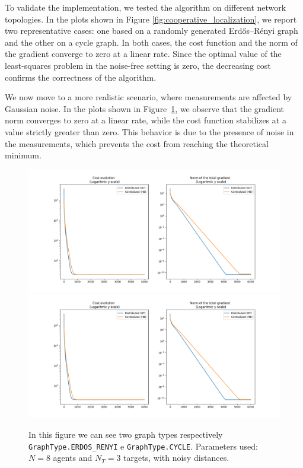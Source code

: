 To validate the implementation, we tested the algorithm on different network topologies. In the plots shown in Figure \ref{fig:cooperative_localization}, we report two representative cases: one based on a randomly generated Erd\H{o}s--R\'enyi graph and the other on a cycle graph. In both cases, the cost function and the norm of the gradient converge to zero at a linear rate. Since the optimal value of the least-squares problem in the noise-free setting is zero, the decreasing cost confirms the correctness of the algorithm.

We now move to a more realistic scenario, where measurements are affected by Gaussian noise.
In the plots shown in Figure~\ref{fig:cooperative_localization_noisy}, we observe that the gradient norm converges to zero at a linear rate, while the cost function stabilizes at a value strictly greater than zero. This behavior is due to the presence of noise in the measurements, which prevents the cost from reaching the theoretical minimum.

\begin{figure}[H]
    \includegraphics[width=0.5\linewidth]{report/figs/cooperative_localization_1_erdos_noisy.png}
    \includegraphics[width=0.5\linewidth]{report/figs/cooperative_localization_2_cycle_noisy.png}
     \caption{In this figure we can see two graph types respectively \texttt{GraphType.ERDOS\_RENYI} e \texttt{GraphType.CYCLE}. Parameters used: $N = 8$ agents and $N_T = 3$ targets, with noisy distances.}
     \label{fig:cooperative_localization_noisy}
\end{figure}



